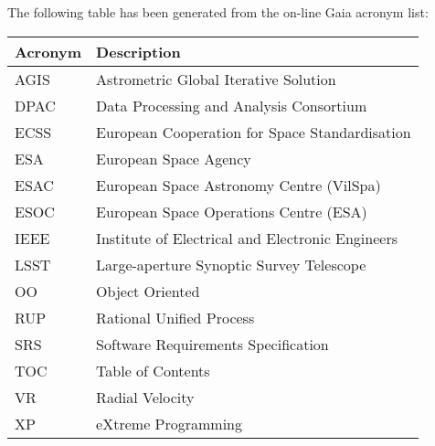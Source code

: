 The following table has been generated from the on-line Gaia acronym list:
\newline\newline%
\addtocounter{table}{-1}
\begin{longtable}{|l|p{}|}\hline 
\textbf{Acronym} & \textbf{Description}  \\\hline
AGIS&Astrometric Global Iterative Solution \\\hline
DPAC&Data Processing and Analysis Consortium \\\hline
ECSS&European Cooperation for Space Standardisation \\\hline
ESA&European Space Agency \\\hline
ESAC&European Space Astronomy Centre (VilSpa) \\\hline
ESOC&European Space Operations Centre (ESA) \\\hline
IEEE&Institute of Electrical and Electronic Engineers \\\hline
LSST&Large-aperture Synoptic Survey Telescope \\\hline
OO&Object Oriented \\\hline
RUP&Rational Unified Process \\\hline
SRS&Software Requirements Specification \\\hline
TOC&Table of Contents \\\hline
VR&Radial Velocity \\\hline
XP&eXtreme Programming \\\hline
\end{longtable} 
